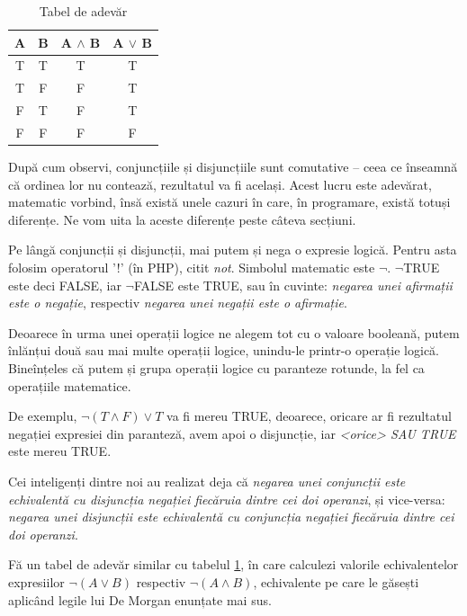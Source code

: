 \begin{table}[h!]
  \begin{center}
    \begin{tabular}{| c | c | c | c|}
    \hline
    A & B & A $\land$ B & A $\lor$ B\\
    \hline
    T & T & T & T\\
    \hline
    T & F & F & T\\
    \hline
    F & T & F & T\\
    \hline
    F & F & F & F\\
    \hline
    \end{tabular}
    \end{center}
    \caption{Tabel de adevăr}
    \label{tbl:truth table and or}
\end{table}

După cum observi, conjuncțiile și disjuncțiile sunt comutative -- ceea ce înseamnă
că ordinea lor nu contează, rezultatul va fi același. Acest lucru este adevărat,
matematic vorbind, însă există unele cazuri în care, în programare, există totuși
diferențe. Ne vom uita la aceste diferențe peste câteva secțiuni.

Pe lângă conjuncții și disjuncții, mai putem și nega o expresie logică. Pentru
asta folosim operatorul '!' (în PHP), citit \textit{not}. Simbolul matematic
este $\lnot$. $\lnot$TRUE este deci FALSE, iar $\lnot$FALSE este TRUE, sau în cuvinte:
\textit{negarea unei afirmații este o negație}, respectiv \textit{negarea unei negații este o afirmație}.

Deoarece în urma unei operații logice ne alegem tot cu o valoare booleană,
putem înlănțui două sau mai multe operații logice, unindu-le printr-o operație logică.
Bineînțeles că putem și grupa operații logice cu paranteze rotunde, la fel
ca operațiile matematice.

De exemplu, 
$\lnot(T \land F) \lor T$ va fi mereu TRUE, deoarece, oricare ar fi rezultatul negației
expresiei din paranteză,
avem apoi o disjuncție, iar \textit{<orice> SAU TRUE} este mereu TRUE.


\begin{Exercise}[title={Legile lui De Morgan},difficulty=2]
Cei inteligenți dintre noi au realizat deja că \textit{negarea unei conjuncții este echivalentă
cu disjuncția negației fiecăruia dintre cei doi operanzi}, și vice-versa: \textit{negarea unei disjuncții
este echivalentă cu conjuncția negației fiecăruia dintre cei doi operanzi}.

Fă un tabel de adevăr similar cu tabelul \ref{tbl:truth table and or}, în care calculezi
valorile echivalentelor expresiilor $\lnot(A \lor B)$ respectiv $\lnot(A \land B)$,
echivalente pe care le găsești aplicând legile lui De Morgan enunțate mai sus.
\end{Exercise}

